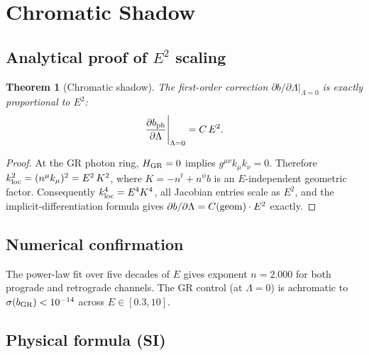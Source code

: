 \documentclass[12pt,a4paper]{article}
\newtheorem{theorem}{Theorem}
\newcommand{\bph}{b_{\rm ph}}
\begin{document}
\section{Chromatic Shadow}
\label{sec:chromatic}

\subsection{Analytical proof of $E^2$ scaling}

\begin{theorem}[Chromatic shadow]
\label{thm:chromatic}
The first-order correction $\partial b/\partial\Lambda|_{\Lambda=0}$
is exactly proportional to $E^2$:
\begin{equation}
  \frac{\partial \bph}{\partial\Lambda}\Bigg|_{\Lambda=0} = C\,E^2.
\end{equation}
\end{theorem}

\begin{proof}
At the GR photon ring, $H_{\rm GR}=0$ implies $g^{\mu\nu}k_\mu k_\nu=0$.
Therefore
$k_{\rm loc}^2 = (n^\mu k_\mu)^2 = E^2\,K^2$, where
$K=-n^t + n^\phi b$ is an $E$-independent geometric factor.
Consequently $k_{\rm loc}^4=E^4 K^4$, all Jacobian entries scale as $E^2$,
and the implicit-differentiation formula gives
$\partial b/\partial\Lambda = C({\rm geom})\cdot E^2$ exactly.
\end{proof}

\subsection{Numerical confirmation}

The power-law fit over five decades of $E$ gives exponent $n=2.000$
for both prograde and retrograde channels.
The GR control (at $\Lambda=0$) is achromatic to
$\sigma(b_{\rm GR})<10^{-14}$ across $E\in[0.3,10]$.

\subsection{Physical formula (SI)}
\end{document}
